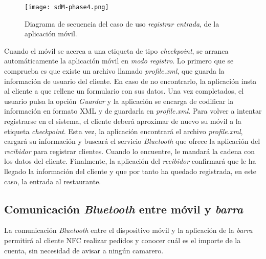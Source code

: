   \begin{figure}[!h]
    \begin{center}
      \texttt{[image: sdM-phase4.png]}
      \caption{Diagrama de secuencia del caso de uso \emph{registrar entrada},
      de la aplicación móvil.}
      \label{fig:sdM-phase4}
    \end{center}
  \end{figure}

Cuando el móvil se acerca a una etiqueta de tipo \emph{checkpoint}, se
arranca automáticamente la aplicación móvil en \emph{modo registro}. Lo
primero que se comprueba es que existe un archivo llamado \emph{profile.xml},
que guarda la información de usuario del cliente. En caso de no encontrarlo,
la aplicación insta al cliente a que rellene un formulario con sus datos.
Una vez completados, el usuario pulsa la opción \emph{Guardar} y la
aplicación se encarga de codificar la información en formato \acs{XML} y de
guardarla en \emph{profile.xml}. Para volver a intentar registrarse en el
sistema, el cliente deberá aproximar de nuevo su móvil a la etiqueta
\emph{checkpoint}. Esta vez, la aplicación encontrará el archivo
\emph{profile.xml}, cargará su información y buscará el servicio
\emph{Bluetooth} que ofrece la aplicación del \emph{recibidor} para
registrar clientes. Cuando lo encuentre, le mandará la cadena con los datos
del cliente. Finalmente, la aplicación del \emph{recibidor} confirmará que
le ha llegado la información del cliente y que por tanto ha quedado
registrada, en este caso, la entrada al restaurante.


\subsection{Comunicación \emph{Bluetooth} entre móvil y \emph{barra}}
\label{subsec:mobile-bar}
La comunicación \emph{Bluetooth} entre el dispositivo móvil y la aplicación
de la \emph{barra} permitirá al cliente \acs{NFC} realizar pedidos y conocer
cuál es el importe de la cuenta, sin necesidad de avisar a ningún camarero.

